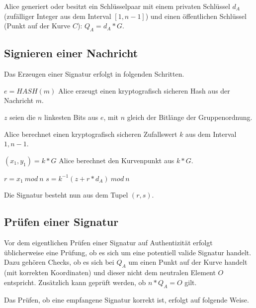 Alice generiert oder besitzt ein Schlüsselpaar mit einem privaten Schlüssel $d_A$ (zufälliger Integer aus dem Interval $[1, n-1]$) 
und einen öffentlichen Schlüssel (Punkt auf der Kurve $C$): $Q_A = d_A*G$.

\subsection{Signieren einer Nachricht}\label{sign}

Das Erzeugen einer Signatur erfolgt in folgenden Schritten.

\begin{compactenum}[(1)]
	\item $e = HASH(m)$ \newline Alice erzeugt einen kryptografisch sicheren Hash aus der Nachricht $m$.
	\item $z$ seien die $n$ linkesten Bits aus $e$, mit $n$ gleich der Bitlänge der Gruppenordnung.
	\item Alice berechnet einen kryptografisch sicheren Zufallswert $k$ aus dem Interval $1, n-1$.
	\item $(x_1, y_1) = k * G$ \newline Alice berechnet den Kurvenpunkt aus $k*G$.
	\item $r = x_1\ mod\ n$ \newline $s = k^{-1}(z+r*d_A)\ mod\ n$
\end{compactenum}

Die Signatur besteht nun aus dem Tupel $(r,s)$.

\subsection{Prüfen einer Signatur}\label{validate_Signature}

Vor dem eigentlichen Prüfen einer Signatur auf Authentizität erfolgt üblicherweise eine Prüfung, ob es sich um
eine potentiell valide Signatur handelt. Dazu gehören Checks, ob es sich bei $Q_A$ um einen Punkt auf der Kurve handelt
(mit korrekten Koordinaten) und dieser nicht dem neutralen Element $O$ entspricht. Zusätzlich kann geprüft werden, ob 
$n*Q_A = O$ gilt.

Das Prüfen, ob eine empfangene Signatur korrekt ist, erfolgt auf folgende Weise.

